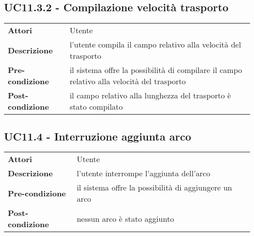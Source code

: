 \subsection{UC11.3.2 - Compilazione velocità trasporto}
\label{sssec:UC11.3.2}
\def\arraystretch{1.5}
\begin{tabularx}{\textwidth}{l|p{}}
\rowcolor{I} \multicolumn{2}{c}{\color{white}\textbf{UC11.3.2 - Compilazione velocità trasporto}} \\
\toprule
\endhead
\textbf{Attori} & Utente\\
\textbf{Descrizione} & l'utente compila il campo relativo alla velocità del trasporto\\
\textbf{Pre-condizione} & il sistema offre la possibilità di compilare il campo relativo alla velocità del trasporto\\
\textbf{Post-condizione} & il campo relativo alla lunghezza del trasporto è stato compilato\\
\bottomrule
\end{tabularx}
\subsection{UC11.4 - Interruzione aggiunta arco}
\label{sssec:UC11.4}
\def\arraystretch{1.5}
\begin{tabularx}{\textwidth}{l|p{}}
\rowcolor{I} \multicolumn{2}{c}{\color{white}\textbf{UC11.4 - Interruzione aggiunta arco}} \\
\toprule
\endhead
\textbf{Attori} & Utente\\
\textbf{Descrizione} & l'utente interrompe l'aggiunta dell'arco\\
\textbf{Pre-condizione} & il sistema offre la possibilità di aggiungere un arco\\
\textbf{Post-condizione} & nessun arco è stato aggiunto\\
\bottomrule
\end{tabularx}
